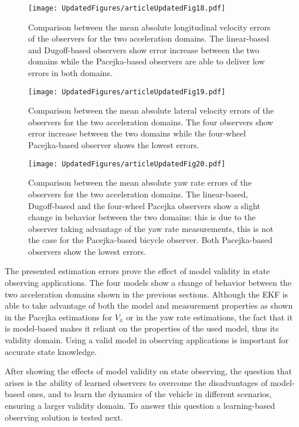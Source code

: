 \documentclass[journal]{IEEEtran}
\begin{document}

\begin{figure}[h]
    \centering
    \texttt{[image: UpdatedFigures/articleUpdatedFig18.pdf]}
    \caption{Comparison between the mean absolute longitudinal velocity errors of the observers for the two acceleration domains. The linear-based and Dugoff-based observers show error increase between the two domains while the Pacejka-based observers are able to deliver low errors in both domains.}
    \label{obsCompVx.fig}
\end{figure}
\begin{figure}[h]
    \centering
    \texttt{[image: UpdatedFigures/articleUpdatedFig19.pdf]}
    \caption{Comparison between the mean absolute lateral velocity errors of the observers for the two acceleration domains. The four observers show error increase between the two domains while the four-wheel Pacejka-based observer shows the lowest errors.}
    \label{obsCompVy.fig}
\end{figure}
\begin{figure}[h]
    \centering
    \texttt{[image: UpdatedFigures/articleUpdatedFig20.pdf]}
    \caption{Comparison between the mean absolute yaw rate errors of the observers for the two acceleration domains. The linear-based, Dugoff-based and the four-wheel Pacejka observers show a slight change in behavior between the two domains: this is due to the observer taking advantage of the yaw rate measurements, this is not the case for the Pacejka-based bicycle observer. Both Pacejka-based observers show the lowest errors.}
    \label{obsCompPsidot.fig}
\end{figure}

The presented estimation errors prove the effect of model validity in state observing applications. The four models show a change of behavior between the two acceleration domains shown in the previous sections. Although the EKF is able to take advantage of both the model and measurement properties as shown in the Pacejka estimations for $V_x$ or in the yaw rate estimations, the fact that it is model-based makes it reliant on the properties of the used model, thus its validity domain. Using a valid model in observing applications is important for accurate state knowledge. 

After showing the effects of model validity on state observing, the question that arises is the ability of learned observers to overcome the disadvantages of model-based ones, and to learn the dynamics of the vehicle in different scenarios, ensuring a larger validity domain. To answer this question a learning-based observing solution is tested next. 
\end{document}
